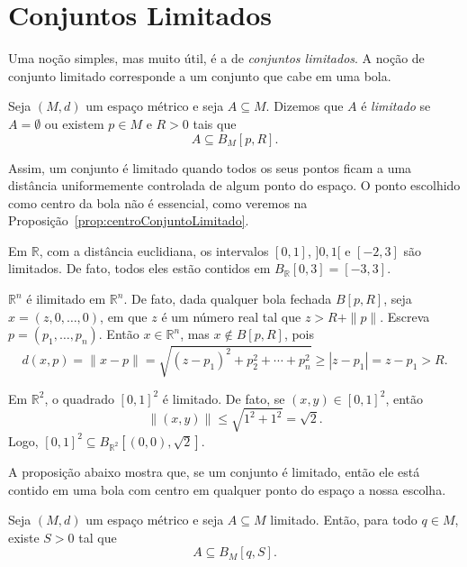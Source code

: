 \section{Conjuntos Limitados}

Uma noção simples, mas muito útil, é a de \emph{conjuntos limitados}.
A noção de conjunto limitado corresponde a um conjunto que cabe em uma bola.

\begin{definition}
    Seja $(M,d)$ um espaço métrico e seja $A\subseteq M$.
    Dizemos que $A$ é \emph{limitado} se $A=\emptyset$ ou existem $p\in M$ e $R>0$ tais que
    \[
        A\subseteq B_M[p,R].
    \]
\end{definition}

Assim, um conjunto é limitado quando todos os seus pontos ficam a uma distância uniformemente controlada de algum ponto do espaço.
O ponto escolhido como centro da bola não é essencial, como veremos na Proposição~\ref{prop:centroConjuntoLimitado}.

\begin{example}
    Em $\mathbb R$, com a distância euclidiana, os intervalos $[0,1]$, $]0,1[$ e $[-2,3]$ são limitados.
    De fato, todos eles estão contidos em $B_{\mathbb R}[0,3]=[-3,3]$.
\end{example}

\begin{example}
    $\mathbb R^n$ é ilimitado em $\mathbb R^n$.
    De fato, dada qualquer bola fechada $B[p,R]$, seja $x=(z, 0, \dots, 0)$, em que $z$ é um número real tal que $z > R + \|p\|$.
    Escreva $p=(p_1, \dots, p_n)$.
    Então $x\in\mathbb R^n$, mas $x\notin B[p,R]$, pois
    \[
        d(x,p)=\|x-p\|
        =\sqrt{(z-p_1)^2+p_2^2+\cdots+p_n^2}
        \geq |z-p_1|=z-p_1>R.
    \]
\end{example}

\begin{example}
    Em $\mathbb R^2$, o quadrado $[0,1]^2$ é limitado.
    De fato, se $(x,y)\in[0,1]^2$, então
    \[
        \|(x,y)\|\leq \sqrt{1^2+1^2}=\sqrt2.
    \]
    Logo, $[0,1]^2\subseteq B_{\mathbb R^2}[(0,0),\sqrt2]$.
\end{example}

A proposição abaixo mostra que, se um conjunto é limitado, então ele está contido em uma bola com centro em qualquer ponto do espaço a nossa escolha.

\begin{proposition}\label{prop:centroConjuntoLimitado}
    Seja $(M,d)$ um espaço métrico e seja $A\subseteq M$ limitado.
    Então, para todo $q\in M$, existe $S>0$ tal que
    \[
        A\subseteq B_M[q,S].
    \]
\end{proposition}

